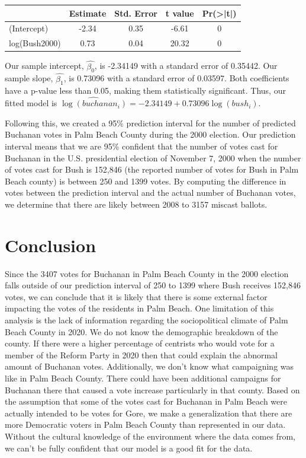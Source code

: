 \documentclass[
  letterpaper,
  DIV=11,
  numbers=noendperiod]{scrartcl}
\begin{document}
\begin{table}[H]
\centering
\begin{tabular}[t]{lcccc}
\toprule
  & Estimate & Std. Error & t value & Pr(>|t|)\\
\midrule
(Intercept) & -2.34 & 0.35 & -6.61 & 0\\
log(Bush2000) & 0.73 & 0.04 & 20.32 & 0\\
\bottomrule
\end{tabular}
\end{table}

Our sample intercept, \(\hat{\beta_0}\), is -2.34149 with a standard
error of 0.35442. Our sample slope, \(\hat{\beta_1}\), is 0.73096 with a
standard error of 0.03597. Both coefficients have a p-value less than
0.05, making them statistically significant. Thus, our fitted model is
\(\widehat{\log(buchanan_i)} = -2.34149 + 0.73096\log(bush_i).\)

Following this, we created a 95\% prediction interval for the number of
predicted Buchanan votes in Palm Beach County during the 2000 election.
Our prediction interval means that we are 95\% confident that the number
of votes cast for Buchanan in the U.S. presidential election of November
7, 2000 when the number of votes cast for Bush is 152,846 (the reported
number of votes for Bush in Palm Beach county) is between 250 and 1399
votes. By computing the difference in votes between the prediction
interval and the actual number of Buchanan votes, we determine that
there are likely between 2008 to 3157 miscast ballots.

\section{Conclusion}\label{conclusion}

Since the 3407 votes for Buchanan in Palm Beach County in the 2000
election falls outside of our prediction interval of 250 to 1399 where
Bush receives 152,846 votes, we can conclude that it is likely that
there is some external factor impacting the votes of the residents in
Palm Beach. One limitation of this analysis is the lack of information
regarding the sociopolitical climate of Palm Beach County in 2020. We do
not know the demographic breakdown of the county. If there were a higher
percentage of centrists who would vote for a member of the Reform Party
in 2020 then that could explain the abnormal amount of Buchanan votes.
Additionally, we don't know what campaigning was like in Palm Beach
County. There could have been additional campaigns for Buchanan there
that caused a vote increase particularly in that county. Based on the
assumption that some of the votes cast for Buchanan in Palm Beach were
actually intended to be votes for Gore, we make a generalization that
there are more Democratic voters in Palm Beach County than represented
in our data. Without the cultural knowledge of the environment where the
data comes from, we can't be fully confident that our model is a good
fit for the data.
\end{document}
